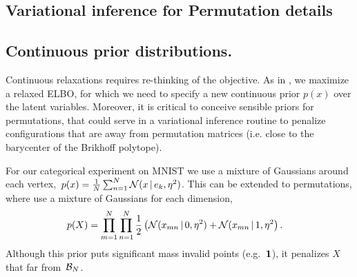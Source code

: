 \documentclass[twoside]{article}
\begin{document}



\subsection*{Variational inference for Permutation details}

\subsection*{Continuous prior distributions.} 
Continuous relaxations requires
re-thinking of the objective. As in \cite{maddison2016concrete}, we
maximize a relaxed ELBO, for which we need to specify a new continuous
prior $p(x)$ over the latent variables. Moreover, it is critical to conceive sensible priors for permutations, that could serve in a variational inference routine to penalize configurations that are away from permutation matrices (i.e. close to the barycenter of the Brikhoff polytope).

For our categorical experiment on MNIST we use a mixture of Gaussians around
each vertex,~${p(x) = \tfrac{1}{N} \sum_{n=1}^N \mathcal{N}(x \, | \, e_k, \eta^2)}$. 
This can be extended to permutations, where use a mixture of Gaussians for each
dimension,
\begin{align}
\label{eq:permprior}
  \nonumber p(X) &= \prod_{m=1}^N \prod_{n=1}^N
  \frac{1}{2} \left(\mathcal{N}(x_{mn} \, | \, 0, \eta^2) + \mathcal{N}(x_{mn} \, | \, 1, \eta^2 \right).
  \end{align}
Although this prior puts significant mass invalid points
(e.g.~$\boldsymbol{1}$), it penalizes $X$ that far from~$\mathcal{B}_N$.
\end{document}
